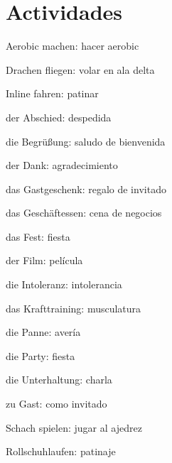 \section{Actividades}
\begin{multicols}{2}
\begin{myitemize}
\item Aerobic machen: hacer aerobic
\item Drachen fliegen: volar en ala delta
\item Inline fahren: patinar
\item der Abschied: despedida
\item die Begrüßung: saludo de bienvenida
\item der Dank: agradecimiento
\item das Gastgeschenk: regalo de invitado
\item das Geschäftessen: cena de negocios
\item das Fest: fiesta
\item der Film: película
\item die Intoleranz: intolerancia
\item das Krafttraining: musculatura
\item die Panne: avería
\item die Party: fiesta
\item die Unterhaltung: charla
\item zu Gast: como invitado
\item Schach spielen: jugar al ajedrez
\item Rollschuhlaufen: patinaje
\end{myitemize}
\end{multicols}


